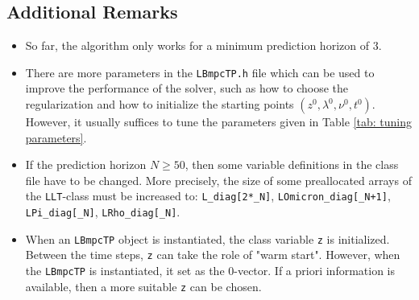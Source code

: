 \documentclass[letter]{article}
\begin{document}
\begin{sffamily}
\subsection{Additional Remarks}
\begin{itemize}
	\item So far, the algorithm only works for a minimum prediction horizon of $3$.
	\item There are more parameters in the \texttt{LBmpcTP.h} file which can be used to improve the performance of the solver, such as how to choose the regularization and how to initialize the starting points $(z^0,\lambda^0,\nu^0,t^0)$. However, it usually suffices to tune  the parameters given in Table \eqref{tab: tuning parameters}.
	\item If the prediction horizon $N\geq50$, then some variable definitions in the class file have to be changed. More precisely, the size of some preallocated arrays of the \texttt{LLT}-class must be increased to: \texttt{L\_diag[2*\_N]}, \texttt{LOmicron\_diag[\_N+1]}, \texttt{LPi\_diag[\_N]}, \texttt{LRho\_diag[\_N]}.
	
	\item When an \texttt{LBmpcTP} object is instantiated, the class variable \texttt{z} is initialized. Between the time steps, \texttt{z} can take  the role of "warm start". However, when the \texttt{LBmpcTP} is instantiated, it set as the $0$-vector. If a priori information is available, then a more suitable \texttt{z} can be chosen.
\end{itemize}



%

%



\end{sffamily}		%



\end{document}
